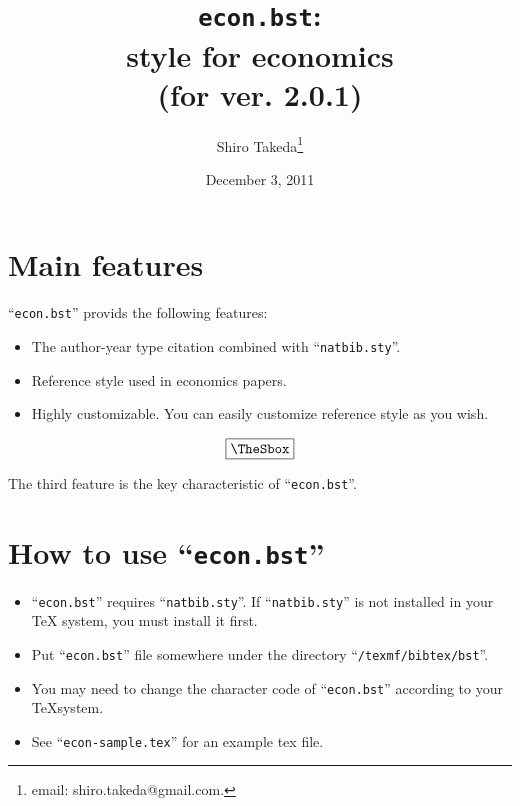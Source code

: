 \documentclass[10pt]{article}
\title{\texttt{econ.bst}:\\ \BibTeX{} style for economics\\ (for ver. 2.0.1)}
\author{Shiro Takeda\thanks{email: {\ttfamily shiro.takeda@gmail.com}.}}
\date{December 3, 2011}
\newenvironment{Frame}%
{\setlength{\fboxsep}{15pt}
\setlength{\mylength}{\linewidth}%
\addtolength{\mylength}{-2\fboxsep}%
\addtolength{\mylength}{-2\fboxrule}%
\Sbox
\minipage{\mylength}%
\setlength{\abovedisplayskip}{0pt}%
\setlength{\belowdisplayskip}{0pt}%
}%
{\endminipage\endSbox
\[\fbox{\TheSbox}\]}
\begin{document}
\maketitle

\newlength{\mylength}
\setlength{\fboxsep}{15pt}
\setlength{\mylength}{\linewidth}
\addtolength{\mylength}{-2\fboxsep}
\addtolength{\mylength}{-2\fboxrule}

\tableofcontents



\section{Main features}

``\texttt{econ.bst}'' provids the following features:
\begin{Frame}
 \begin{itemize}
  \item The author-year type citation combined with ``\texttt{natbib.sty}''.
  \item Reference style used in economics papers.
  \item Highly customizable.  You can easily customize reference style as
       you wish.
 \end{itemize}
\end{Frame}

The third feature is the key characteristic of ``\texttt{econ.bst}''.

\section{How to use ``\texttt{econ.bst}''}

\begin{itemize}
 \item ``\texttt{econ.bst}'' requires ``\texttt{natbib.sty}''. 
       If ``\texttt{natbib.sty}'' is not installed in your \TeX{} system, you must
       install it first.
 \item Put ``\texttt{econ.bst}'' file somewhere under the directory
       ``\texttt{/texmf/bibtex/bst}''.
 \item You may need to change the character code of ``\texttt{econ.bst}''
       according to your \TeX system.
 \item See ``\texttt{econ-sample.tex}'' for an example tex file.
\end{itemize}
\end{document}
